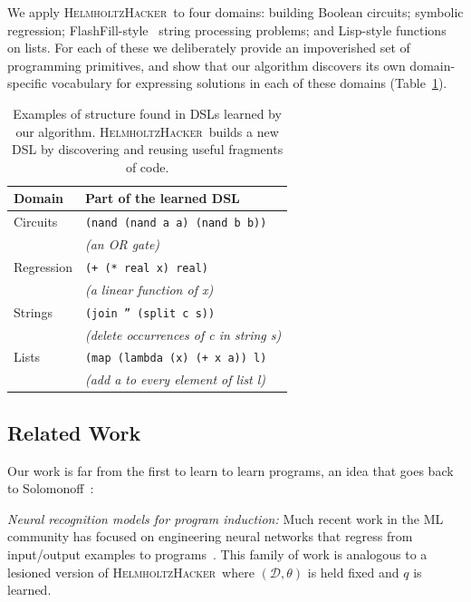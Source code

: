 \documentclass{article}
\newcommand{\system}{\textsc{HelmholtzHacker}~}
\begin{document}
We apply \system to four domains:
 building Boolean circuits; symbolic regression; FlashFill-style~\cite{gulwani2011automating} string processing problems; and Lisp-style functions on lists.
 For each of these we deliberately provide an impoverished
 set of programming primitives,
 and show that our algorithm discovers
 its own domain-specific vocabulary for expressing solutions in each of these domains (Table~\ref{initialExampleDSL}).
 \begin{table}
    \begin{tabular}{ll}
   \toprule
   Domain&Part of the learned DSL\\\midrule
   Circuits&\texttt{(nand (nand a a) (nand b b))}\\
   &\hspace{0.5cm} \emph{(an OR gate)}\\
   Regression& \texttt{(+ (* real x) real)} \\
      &\hspace{0.5cm} \emph{(a linear function of x)}\\
   Strings& \texttt{(join '' (split c s))}\\
   &\hspace{0.5cm} \emph{(delete occurrences of c in string s)}\\
   Lists& \texttt{(map (lambda (x) (+ x a)) l)}\\
   &\hspace{0.5cm} \emph{(add a to every element of list l)}
   \\\bottomrule
    \end{tabular}
    \caption{ Examples of structure found in DSLs  learned by our algorithm. \system builds a new DSL by discovering and reusing useful fragments of code.}\label{initialExampleDSL}
 \end{table}


 \subsection{Related Work}
 Our work is far from the first to learn to learn programs,
 an  idea that goes back to Solomonoff~\cite{solomonoff1989system}:

 \noindent \emph{Neural recognition models for program induction:} Much recent work in the ML community has
 focused on engineering neural networks that regress from
 input/output examples to programs~\cite{devlin2017robustfill,devlin2017neural,menon2013machine,balog2016deepcoder}. This family of work is analogous to a lesioned version of
 \system where $(\mathcal{D},\theta)$ is held fixed and $q$ is learned.
\end{document}
